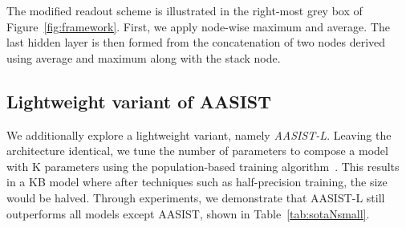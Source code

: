 \documentclass{article}
\begin{document}
The modified readout scheme is illustrated in the right-most grey box of Figure~\ref{fig:framework}.
First, we apply node-wise maximum and average. 
The last hidden layer is then formed from the concatenation of two nodes derived using average and maximum along with the stack node. 

\subsection{Lightweight variant of AASIST}
\label{ssec:smallModel}
We additionally explore a lightweight variant, namely {\em AASIST-L}. 
Leaving the architecture identical, we tune the number of parameters to compose a model with K parameters using the population-based training algorithm~\cite{jaderberg2017population}. 
This results in a KB model where after techniques such as half-precision training, the size would be halved.
Through experiments, we demonstrate that AASIST-L still outperforms all models except AASIST, shown in Table~\ref{tab:sotaNsmall}. 
\end{document}
